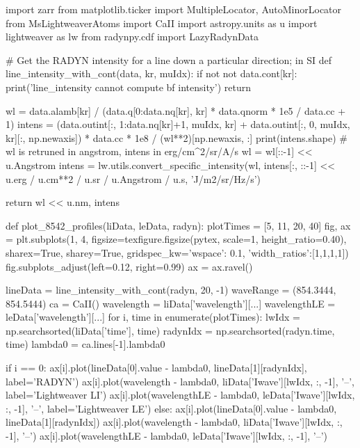 \begin{pycode}[TimeDepRT]
import zarr
from matplotlib.ticker import MultipleLocator, AutoMinorLocator
from MsLightweaverAtoms import CaII
import astropy.units as u
import lightweaver as lw
from radynpy.cdf import LazyRadynData

# Get the RADYN intensity for a line down a particular direction; in SI
def line_intensity_with_cont(data, kr, muIdx):
    if not not data.cont[kr]:
        print('line_intensity cannot compute bf intensity')
        return

    wl = data.alamb[kr] / (data.q[0:data.nq[kr], kr] *  data.qnorm * 1e5 / data.cc + 1)
    intens = (data.outint[:, 1:data.nq[kr]+1, muIdx, kr] + data.outint[:, 0, muIdx, kr][:, np.newaxis]) *  data.cc * 1e8 / (wl**2)[np.newaxis, :]
    print(intens.shape)
    # wl is retruned in angstrom, intens in erg/cm^2/sr/A/s
    wl = wl[::-1] << u.Angstrom
    intens = lw.utils.convert_specific_intensity(wl, intens[:, ::-1] << u.erg / u.cm**2 / u.sr / u.Angstrom / u.s, 'J/m2/sr/Hz/s')

    return wl << u.nm, intens

def plot_8542_profiles(liData, leData, radyn):
    plotTimes = [5, 11, 20, 40]
    fig, ax = plt.subplots(1, 4, figsize=texfigure.figsize(pytex, scale=1, height_ratio=0.40),
                           sharex=True, sharey=True,
                           gridspec_kw={'wspace': 0.1, 'width_ratios':[1,1,1,1]})
    fig.subplots_adjust(left=0.12, right=0.99)
    ax = ax.ravel()

    lineData = line_intensity_with_cont(radyn, 20, -1)
    waveRange = (854.3444, 854.5444)
    ca = CaII()
    wavelength = liData['wavelength'][...]
    wavelengthLE = leData['wavelength'][...]
    for i, time in enumerate(plotTimes):
        lwIdx = np.searchsorted(liData['time'], time)
        radynIdx = np.searchsorted(radyn.time, time)
        lambda0 = ca.lines[-1].lambda0

        if i == 0:
            ax[i].plot(lineData[0].value - lambda0, lineData[1][radynIdx], label='RADYN')
            ax[i].plot(wavelength - lambda0, liData['Iwave'][lwIdx, :, -1], '--', label='Lightweaver LI')
            ax[i].plot(wavelengthLE - lambda0, leData['Iwave'][lwIdx, :, -1], '--', label='Lightweaver LE')
        else:
            ax[i].plot(lineData[0].value - lambda0, lineData[1][radynIdx])
            ax[i].plot(wavelength - lambda0, liData['Iwave'][lwIdx, :, -1], '--')
            ax[i].plot(wavelengthLE - lambda0, leData['Iwave'][lwIdx, :, -1], '--')


\end{pycode}
